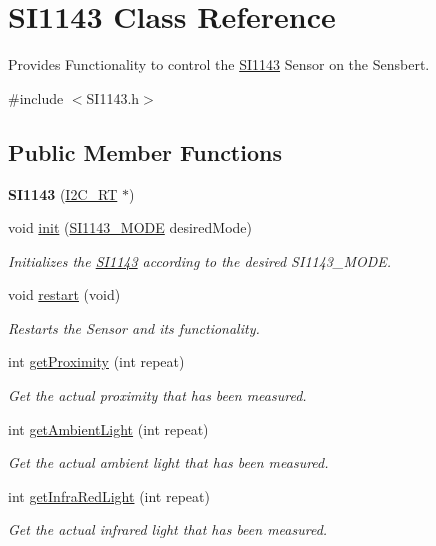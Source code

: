 \hypertarget{class_s_i1143}{}\section{S\+I1143 Class Reference}
\label{class_s_i1143}


Provides Functionality to control the \hyperlink{class_s_i1143}{S\+I1143} Sensor on the Sensbert.  




{\ttfamily \#include $<$S\+I1143.\+h$>$}

\subsection*{Public Member Functions}
\begin{DoxyCompactItemize}
\item 
\hypertarget{class_s_i1143_aebff43d7a1751c813383535224688602}{}{\bfseries S\+I1143} (\hyperlink{class_i2_c___r_t}{I2\+C\+\_\+\+R\+T} $\ast$)\label{class_s_i1143_aebff43d7a1751c813383535224688602}

\item 
void \hyperlink{class_s_i1143_a59db8778fd2d6679905488e88ed20f6b}{init} (\hyperlink{_s_i1143_config_8h_ae6d915c2410b566eab9cc10516661ecd}{S\+I1143\+\_\+\+M\+O\+D\+E} desired\+Mode)
\begin{DoxyCompactList}\small\item\em Initializes the \hyperlink{class_s_i1143}{S\+I1143} according to the desired S\+I1143\+\_\+\+M\+O\+D\+E. \end{DoxyCompactList}\item 
\hypertarget{class_s_i1143_ad0dacd5a95351984d0b31be17c4d903d}{}void \hyperlink{class_s_i1143_ad0dacd5a95351984d0b31be17c4d903d}{restart} (void)\label{class_s_i1143_ad0dacd5a95351984d0b31be17c4d903d}

\begin{DoxyCompactList}\small\item\em Restarts the Sensor and its functionality. \end{DoxyCompactList}\item 
int \hyperlink{class_s_i1143_a1c58ac229038e77fc4bfd51c7fc8d902}{get\+Proximity} (int repeat)
\begin{DoxyCompactList}\small\item\em Get the actual proximity that has been measured. \end{DoxyCompactList}\item 
int \hyperlink{class_s_i1143_a58b64b4d0819aca84da212da8be3c0ab}{get\+Ambient\+Light} (int repeat)
\begin{DoxyCompactList}\small\item\em Get the actual ambient light that has been measured. \end{DoxyCompactList}\item 
int \hyperlink{class_s_i1143_a32989c886bac6331caad26af2011b732}{get\+Infra\+Red\+Light} (int repeat)
\begin{DoxyCompactList}\small\item\em Get the actual infrared light that has been measured. \end{DoxyCompactList}\end{DoxyCompactItemize}


